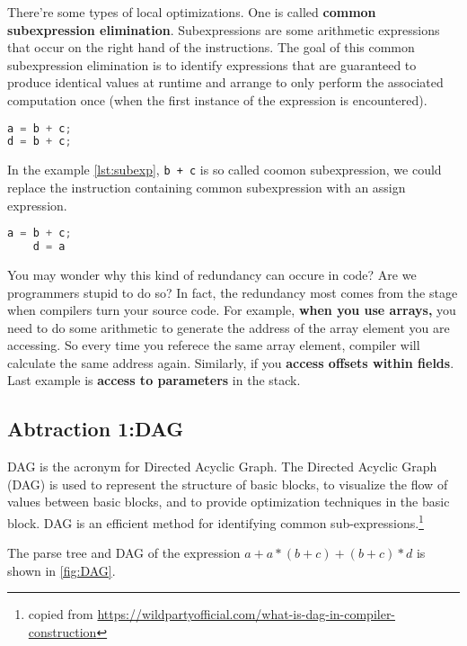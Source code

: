 There're some types of local optimizations. 
One is called \textbf{common subexpression elimination}. Subexpressions are some arithmetic expressions that occur on the
 right hand of the instructions. The goal of this common subexpression elimination is to identify 
 expressions that are guaranteed to produce identical values at runtime and arrange to only perform 
 the associated computation once (when the first instance of the expression is encountered).
 
\begin{lstlisting}[language=C, frame=single,caption=Subexpression example,label=lst:subexp]
a = b + c;
d = b + c;
\end{lstlisting}

In the example \ref{lst:subexp}, \texttt{b + c} is so called coomon subexpression, we could replace the instruction containing 
common subexpression with an assign expression. 


\begin{lstlisting}[language=C, frame=single,caption=code snippet applied common subexpression elimination to \ref{lst:subexp},label=lst:transsubexpr]
    a = b + c;
    d = a
\end{lstlisting}

You may wonder why this kind of redundancy can occure in code? Are we programmers stupid to do so? In fact, 
the redundancy most comes from the stage when compilers  turn your source code. For example, \textbf{when you use arrays,}
you need to do some arithmetic to generate the address of the array element you are accessing. So every time you referece the same
array element, compiler will calculate the same address again. Similarly, if you \textbf{access offsets within fields}. Last example is 
\textbf{access to parameters} in the stack. 


\subsection{Abtraction 1:DAG}

DAG is the acronym for Directed Acyclic Graph. The Directed Acyclic Graph (DAG) is used to represent the 
structure of basic blocks, to visualize the flow of values between basic blocks, and to provide 
optimization techniques in the basic block. DAG is an efficient method for identifying common 
sub-expressions.\footnote{copied from \url{https://wildpartyofficial.com/what-is-dag-in-compiler-construction}}



The parse tree and DAG of the expression \(a + a*(b+c) + (b+c) *d \) is shown in \ref{fig:DAG}.


